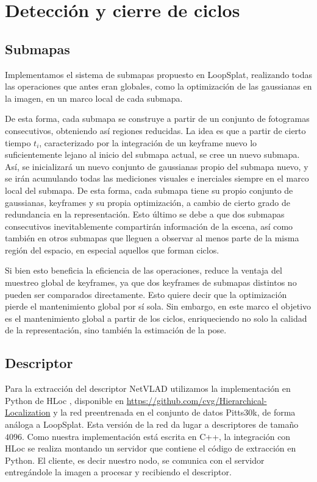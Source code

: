\section{Detección y cierre de ciclos}

\subsection{Submapas}

Implementamos el sistema de submapas propuesto en LoopSplat, realizando todas las operaciones que antes eran globales, como la optimización de las gaussianas en la imagen, en un marco local de cada submapa. 

De esta forma, cada submapa se construye a partir de un conjunto de fotogramas consecutivos, obteniendo así regiones reducidas. La idea es que a partir de cierto tiempo $t_i$, caracterizado por la integración de un keyframe nuevo lo suficientemente lejano al inicio del submapa actual, se cree un nuevo submapa. Así, se inicializará un nuevo conjunto de gaussianas propio del submapa nuevo, y se irán acumulando todas las mediciones visuales e inerciales siempre en el marco local del submapa. De esta forma, cada submapa tiene su propio conjunto de gaussianas, keyframes y su propia optimización, a cambio de cierto grado de redundancia en la representación. Esto último se debe a que dos submapas consecutivos inevitablemente compartirán información de la escena, así como también en otros submapas que lleguen a observar al menos parte de la misma región del espacio, en especial aquellos que forman ciclos.

Si bien esto beneficia la eficiencia de las operaciones, reduce la ventaja del muestreo global de keyframes, ya que dos keyframes de submapas distintos no pueden ser comparados directamente. Esto quiere decir que la optimización pierde el mantenimiento global por sí sola. Sin embargo, en este marco el objetivo es el mantenimiento global a partir de los ciclos, enriqueciendo no solo la calidad de la representación, sino también la estimación de la pose.

\subsection{Descriptor}

Para la extracción del descriptor NetVLAD utilizamos la implementación en Python de HLoc \cite{sarlin2019coarse}, disponible en \url{https://github.com/cvg/Hierarchical-Localization} y la red preentrenada en el conjunto de datos Pitts30k, de forma análoga a LoopSplat. Esta versión de la red da lugar a descriptores de tamaño $4096$. Como nuestra implementación está escrita en C++, la integración con HLoc se realiza montando un servidor que contiene el código de extracción en Python. El cliente, es decir nuestro nodo, se comunica con el servidor entregándole la imagen a procesar y recibiendo el descriptor.

